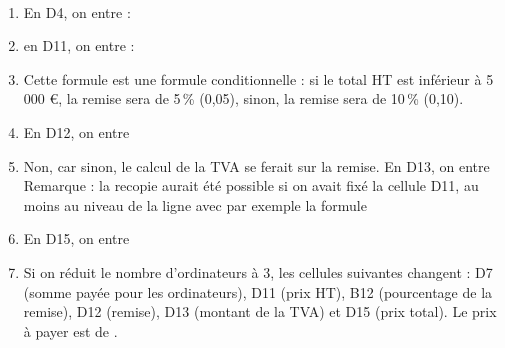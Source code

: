 \ \\ [-5mm]
\begin{enumerate}
   \item En D4, on entre : 
   \item en D11, on entre : 
   \item Cette formule est une formule conditionnelle : si le total HT est inférieur à 5 000 \euro, la remise sera de 5\,\% (0,05), sinon, la remise sera de 10\,\% (0,10).
   \item En D12, on entre 
   \item Non, car sinon, le calcul de la TVA se ferait sur la remise. En D13, on entre  \\
   Remarque : la recopie aurait été possible si on avait fixé la cellule D11, au moins au niveau de la ligne avec par exemple la formule 
   \item En D15, on entre  
   \item Si on réduit le nombre d'ordinateurs à 3, les cellules suivantes changent : D7 (somme payée pour les ordinateurs), D11 (prix HT), B12 (pourcentage de la remise), D12 (remise), D13 (montant de la TVA) et D15 (prix total). Le prix à payer est de .
\end{enumerate}
